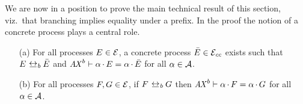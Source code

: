 \noindent
We are now in a position to prove the main technical result of this
section, viz.\ that branching {\bisimilarity} implies equality under a
prefix. In the proof the notion of a concrete process plays a central
role. 

\begin{lemma}
  \label{lemma-branching-bisim-vs-equal-under-prefix}
  \mbox{}
  \begin{itemize}
  \item [(a)] For all processes $E \in \mathcal{E}$, a
    concrete process $\bar{E} \in \mathcal{E}_{\mathit{cc}}$ exists such that $E \brbisim
    \Ebar$ and $\mathit{A \mkern-2mu X}^b \vdash { \alpha \mathop{.}E = \alpha \mathop{.}\bar{E}}$
    for all $\alpha \in \mathcal{A}$.
  \item [(b)] For all processes $F,G \in \mathcal{E}$, if $F \brbisim
    G$ then $\mathit{A \mkern-2mu X}^b \vdash { \alpha \mathop{.}F = \alpha \mathop{.}G }$ for all
    $\alpha \in \mathcal{A}$.%
  \pagebreak[3]
 \end{itemize}
\end{lemma}


